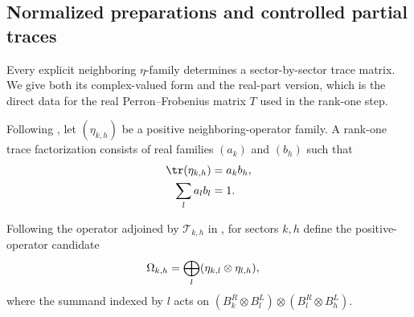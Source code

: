 \subsection{Normalized preparations and controlled partial traces}

\begin{definition}
    \label{def:mpdo_explicit_eta_trace_matrix}
    \leanok
    Every explicit neighboring $\eta$-family determines a sector-by-sector trace
    matrix. We give both its complex-valued form and the real-part version,
    which is the direct data for the real Perron--Frobenius matrix $T$ used
    in the rank-one step.
\end{definition}

\begin{definition}
    \label{def:mpdo_eta_rank_one_trace_factorization}
    \leanok
    Following \cite[Appendix~C.2, lines~1395--1402]{Cirac2016MPDO_arXiv}, let
    $(\eta_{k,h})$ be a positive neighboring-operator family. A rank-one
    trace factorization consists of real families $(a_k)$ and $(b_h)$ such that
    \begin{align}
        \tr(\eta_{k,h}) & = a_kb_h, \notag \\
        \sum_l a_lb_l   & = 1. \notag
    \end{align}
\end{definition}

\begin{definition}
    \label{def:mpdo_eta_omega}
    \leanok
    Following the operator adjoined by $\mathcal T_{k,h}$ in
    \cite[Appendix~C.2, lines~1527--1535]{Cirac2016MPDO_arXiv}, for sectors
    $k,h$ define the positive-operator candidate
    \begin{align}
        \Omega_{k,h}
         & =\bigoplus_l(\eta_{k,l}\otimes\eta_{l,h}), \notag
    \end{align}
    where the summand indexed by $l$ acts on
    $(B_k^R\otimes B_l^L)\otimes(B_l^R\otimes B_h^L)$.
\end{definition}

